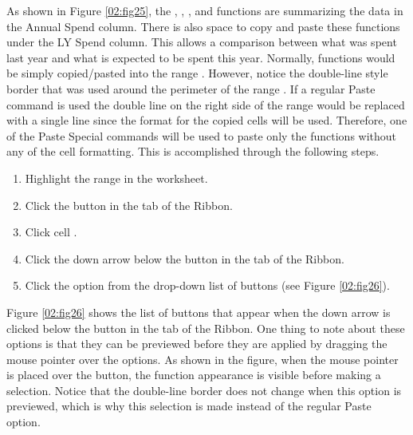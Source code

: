 As shown in Figure \ref{02:fig25}, the , , , and  functions are summarizing the data in the Annual Spend column. There is also space to copy and paste these functions under the LY Spend column. This allows a comparison between what was spent last year and what is expected to be spent this year. Normally, functions would be simply copied/pasted into the range . However, notice the double-line style border that was used around the perimeter of the range . If a regular Paste command is used the double line on the right side of the range  would be replaced with a single line since the format for the copied cells will be used. Therefore, one of the Paste Special commands will be used to paste only the functions without any of the cell formatting. This is accomplished through the following steps.

\begin{enumerate}
	\item Highlight the range  in the  worksheet.
\item Click the  button in the  tab of the Ribbon.
\item Click cell .
\item Click the down arrow below the  button in the  tab of the Ribbon.
\item Click the  option from the drop-down list of buttons (see Figure \ref{02:fig26}).
\end{enumerate}

Figure \ref{02:fig26} shows the list of buttons that appear when the down arrow is clicked below the  button in the  tab of the Ribbon. One thing to note about these options is that they can be previewed before they are applied by dragging the mouse pointer over the options. As shown in the figure, when the mouse pointer is placed over the  button, the function appearance is visible before making a selection. Notice that the double-line border does not change when this option is previewed, which is why this selection is made instead of the regular Paste option.

